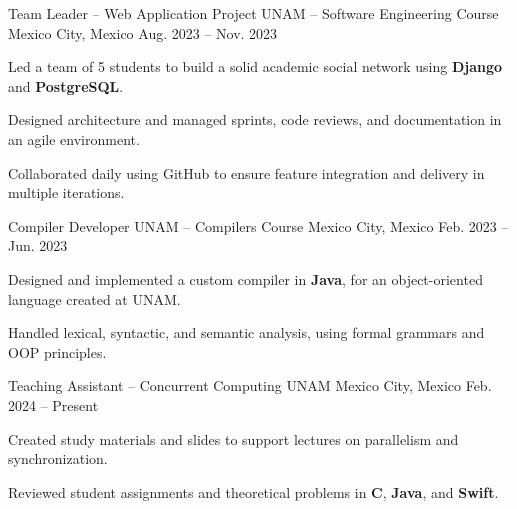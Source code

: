 \begin{cventries}

  \cventry
    {Team Leader – Web Application Project}
    {UNAM – Software Engineering Course}
    {Mexico City, Mexico}
    {Aug. 2023 – Nov. 2023}
    {
      \begin{cvitems}
        \item {Led a team of 5 students to build a solid academic social network using \textbf{Django} and \textbf{PostgreSQL}.}
        \item {Designed architecture and managed sprints, code reviews, and documentation in an agile environment.}
        \item {Collaborated daily using GitHub to ensure feature integration and delivery in multiple iterations.}
      \end{cvitems}
    }

  \cventry
    {Compiler Developer}
    {UNAM – Compilers Course}
    {Mexico City, Mexico}
    {Feb. 2023 – Jun. 2023}
    {
      \begin{cvitems}
        \item {Designed and implemented a custom compiler in \textbf{Java}, for an object-oriented language created at UNAM.}
        \item {Handled lexical, syntactic, and semantic analysis, using formal grammars and OOP principles.}
      \end{cvitems}
    }

  \cventry
    {Teaching Assistant – Concurrent Computing}
    {UNAM}
    {Mexico City, Mexico}
    {Feb. 2024 – Present}
    {
      \begin{cvitems}
        \item {Created study materials and slides to support lectures on parallelism and synchronization.}
        \item {Reviewed student assignments and theoretical problems in \textbf{C}, \textbf{Java}, and \textbf{Swift}.}
      \end{cvitems}
    }

\end{cventries}
